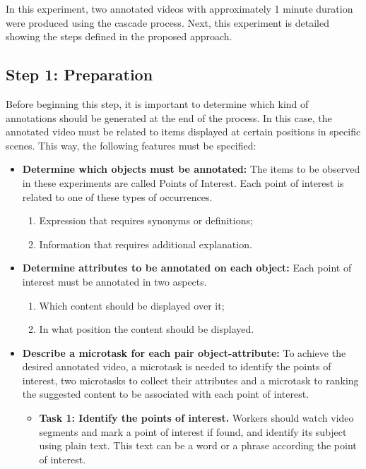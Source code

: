 In this experiment, two annotated videos with approximately 1 minute duration were produced using the cascade process. Next, this experiment is detailed showing the steps defined in the proposed approach.

\subsection{Step 1: Preparation}
Before beginning this step, it is important to determine which kind of annotations should be generated at the end of the process. In this case, the annotated video must be related to items displayed at certain positions in specific scenes. This way, the following features must be specified:
\begin{itemize}
\item \textbf{Determine which objects must be annotated:} \linebreak  
The items to be observed in these experiments are called Points of Interest. Each point of interest is related to one of these types of occurrences.
\begin{enumerate}
\item Expression that requires synonyms or definitions; 
\item Information that requires additional explanation.
\end{enumerate}

\item \textbf{Determine attributes to be annotated on each object:} \linebreak  
Each point of interest must be annotated in two aspects.
\begin{enumerate}
\item Which content should be displayed over it;
\item In what position the content should be displayed.
\end{enumerate}


\item \textbf{Describe a microtask for each pair object-attribute:} \linebreak  
To achieve the desired annotated video, a microtask is needed to identify the points of interest, two microtasks to collect their attributes and a microtask to ranking the suggested content to be associated with each point of interest.

\begin{itemize}
\item \textbf{Task 1: Identify the points of interest.} Workers should watch video segments and mark a point of interest if found, and identify its subject using plain text. This text can be a word or a phrase according the point of interest.


\end{itemize}
\end{itemize}
